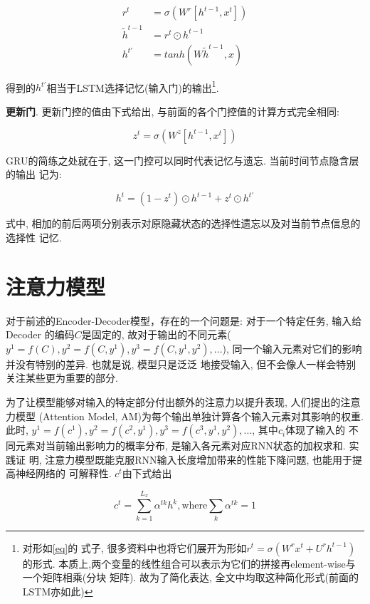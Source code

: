 \documentclass[UTF8, twocolumn]{ctexart}
\begin{document}
\begin{align}
r^t &=\sigma(W^r[h^{t-1},x^t]) \label{eq} \\
\widetilde{h}^{t-1} &= r^t \odot h^{t-1} \\
h^{t\prime} &= tanh(W \widetilde{h}^{t-1}, x)
\end{align}



得到的$h^{t\prime}$相当于LSTM选择记忆(输入门)的输出\footnote{对形如\ref{eq}的
式子, 很多资料中也将它们展开为形如$r^t=\sigma(W^r x^t+U^r h^{t-1})$的形式. 
本质上,两个变量的线性组合可以表示为它们的拼接再element-wise与一个矩阵相乘(分块
矩阵). 故为了简化表达, 全文中均取这种简化形式(前面的LSTM亦如此)}.


{\bf 更新门}. 更新门控的值由下式给出, 与前面的各个门控值的计算方式完全相同:

\begin{equation}
z^t =\sigma(W^z[h^{t-1},x^t])
\end{equation}

GRU的简练之处就在于, 这一门控可以同时代表记忆与遗忘. 当前时间节点隐含层的输出
记为:

\begin{equation}
h^t = (1-z^t) \odot h^{t-1} + z^t \odot h^{t\prime}
\end{equation}

式中, 相加的前后两项分别表示对原隐藏状态的选择性遗忘以及对当前节点信息的选择性
记忆.

\section{注意力模型}
对于前述的Encoder-Decoder模型，存在的一个问题是: 对于一个特定任务, 输入给Decoder
的编码$C$是固定的, 故对于输出的不同元素($y^1=f(C), y^2=f(C, y^1), y^3=f(C, y^1, 
y^2), ...$), 同一个输入元素对它们的影响并没有特别的差异. 也就是说, 模型只是泛泛
地接受输入, 但不会像人一样会特别关注某些更为重要的部分.



为了让模型能够对输入的特定部分付出额外的注意力以提升表现, 人们提出的注意力模型
(Attention Model, AM)为每个输出单独计算各个输入元素对其影响的权重. 此时, 
$y^1=f(c^1), y^2=f(c^2, y^1), y^3=f(c^3, y^1, y^2), ...$, 其中$c_i$体现了输入的
不同元素对当前输出影响力的概率分布, 是输入各元素对应RNN状态的加权求和. 实践证
明, 注意力模型既能克服RNN输入长度增加带来的性能下降问题, 也能用于提高神经网络的
可解释性\cite{8}. $c^t$由下式给出

\begin{equation}
c^t = \sum_{k=1}^{L_x}\alpha^{tk}h^k, \text{where} \sum_k \alpha^{tk} = 1
\end{equation}
\end{document}
